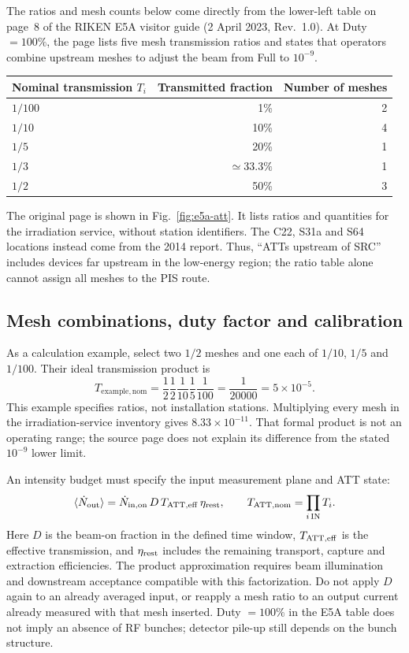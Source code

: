 \documentclass[11pt,a4paper]{article}
\begin{document}
The ratios and mesh counts below come directly from the lower-left table on page~8 of the RIKEN E5A visitor guide (2 April 2023, Rev.~1.0). At Duty $=100\%$, the page lists five mesh transmission ratios and states that operators combine upstream meshes to adjust the beam from Full to $10^{-9}$.\cite{e5a}
\begin{center}
\begin{tabular}{lrr}
\toprule
Nominal transmission $T_i$ & Transmitted fraction & Number of meshes \\
\midrule
$1/100$ & 1\% & 2 \\
$1/10$ & 10\% & 4 \\
$1/5$ & 20\% & 1 \\
$1/3$ & $\simeq33.3\%$ & 1 \\
$1/2$ & 50\% & 3 \\
\bottomrule
\end{tabular}
\end{center}
The original page is shown in Fig.~\ref{fig:e5a-att}. It lists ratios and quantities for the irradiation service, without station identifiers. The C22, S31a and S64 locations instead come from the 2014 report.\cite{att-chambers} Thus, ``ATTs upstream of SRC'' includes devices far upstream in the low-energy region; the ratio table alone cannot assign all meshes to the PIS route.

\subsection{Mesh combinations, duty factor and calibration}
As a calculation example, select two $1/2$ meshes and one each of $1/10$, $1/5$ and $1/100$. Their ideal transmission product is
\[
T_{\mathrm{example,nom}}=\frac12\frac12\frac1{10}\frac15\frac1{100}
=\frac1{20000}=5\times10^{-5}.
\]
This example specifies ratios, not installation stations. Multiplying every mesh in the irradiation-service inventory gives $8.33\times10^{-11}$. That formal product is not an operating range; the source page does not explain its difference from the stated $10^{-9}$ lower limit.

An intensity budget must specify the input measurement plane and ATT state:
\[
\langle\dot N_{\rm out}\rangle
=\dot N_{\rm in,on}\,D\,T_{\rm ATT,eff}\,\eta_{\rm rest},
\qquad T_{\rm ATT,nom}=\prod_{i\,\mathrm{IN}}T_i.
\]
Here $D$ is the beam-on fraction in the defined time window, $T_{\rm ATT,eff}$ is the effective transmission, and $\eta_{\rm rest}$ includes the remaining transport, capture and extraction efficiencies. The product approximation requires beam illumination and downstream acceptance compatible with this factorization. Do not apply $D$ again to an already averaged input, or reapply a mesh ratio to an output current already measured with that mesh inserted. Duty $=100\%$ in the E5A table does not imply an absence of RF bunches; detector pile-up still depends on the bunch structure.
\end{document}
